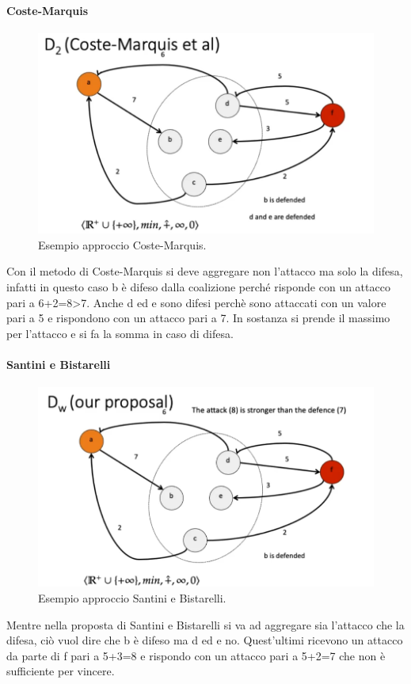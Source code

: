 \paragraph{Coste-Marquis}
\begin{figure}[H]
    \centering
    \includegraphics[width=14cm, keepaspectratio]{img/d2_coste_marquis.png}
    \caption{Esempio approccio Coste-Marquis.}\label{fig:coste_marquis}
\end{figure}
Con il metodo di Coste-Marquis si deve aggregare non l'attacco ma solo la difesa, infatti in questo caso b è difeso dalla coalizione perché risponde con un attacco pari a 6+2=8>7. Anche d ed e sono difesi perchè sono attaccati con un valore pari a 5 e rispondono con un attacco pari a 7. In sostanza si prende il massimo per l'attacco e si fa la somma in caso di difesa. 

\paragraph{Santini e Bistarelli}
\begin{figure}[H]
    \centering
    \includegraphics[width=14cm, keepaspectratio]{img/d_w_santini_bistarelli.png}
    \caption{Esempio approccio Santini e Bistarelli.}\label{fig:d_w_santini_bistarelli}
\end{figure}
Mentre nella proposta di Santini e Bistarelli si va ad aggregare sia l'attacco che la difesa, ciò vuol dire che b è difeso ma d ed e no. Quest'ultimi ricevono un attacco da parte di f pari a 5+3=8 e rispondo con un attacco pari a 5+2=7 che non è sufficiente per vincere.

